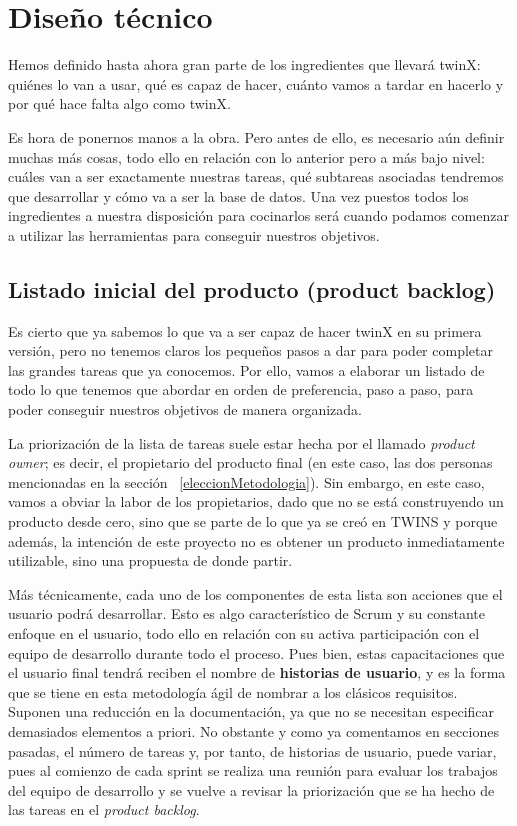 \chapter{Diseño técnico}
\label{diseñotécnico}

Hemos definido hasta ahora gran parte de los ingredientes que llevará twinX: quiénes lo van a usar, qué es capaz de hacer, cuánto vamos a tardar en hacerlo y por qué hace falta algo como twinX.

Es hora de ponernos manos a la obra. Pero antes de ello, es necesario aún definir muchas más cosas, todo ello en relación con lo anterior pero a más bajo nivel: cuáles van a ser exactamente nuestras tareas, qué subtareas asociadas tendremos que desarrollar y cómo va a ser la base de datos. Una vez puestos todos los ingredientes a nuestra disposición para cocinarlos será cuando podamos comenzar a utilizar las herramientas para conseguir nuestros objetivos.

\section{Listado inicial del producto (product backlog)}

Es cierto que ya sabemos lo que va a ser capaz de hacer twinX en su primera versión, pero no tenemos claros los pequeños pasos a dar para poder completar las grandes tareas que ya conocemos. Por ello, vamos a elaborar un listado de todo lo que tenemos que abordar en orden de preferencia, paso a paso, para poder conseguir nuestros objetivos de manera organizada.

La priorización de la lista de tareas suele estar hecha por el llamado \textit{product owner}; es decir, el propietario del producto final (en este caso, las dos personas mencionadas en la sección ~\ref{eleccionMetodologia}). Sin embargo, en este caso, vamos a obviar la labor de los propietarios, dado que no se está construyendo un producto desde cero, sino que se parte de lo que ya se creó en TWINS y porque además, la intención de este proyecto no es obtener un producto inmediatamente utilizable, sino una propuesta de donde partir.

Más técnicamente, cada uno de los componentes de esta lista son acciones que el usuario podrá desarrollar. Esto es algo característico de Scrum y su constante enfoque en el usuario, todo ello en relación con su activa participación con el equipo de desarrollo durante todo el proceso. Pues bien, estas capacitaciones que el usuario final tendrá reciben el nombre de \textbf{historias de usuario}, y es la forma que se tiene en esta metodología ágil de nombrar a los clásicos requisitos. Suponen una reducción en la documentación, ya que no se necesitan especificar demasiados elementos a priori. No obstante y como ya comentamos en secciones pasadas, el número de tareas y, por tanto, de historias de usuario, puede variar, pues al comienzo de cada sprint se realiza una reunión para evaluar los trabajos del equipo de desarrollo y se vuelve a revisar la priorización que se ha hecho de las tareas en el \textit{product backlog}.

